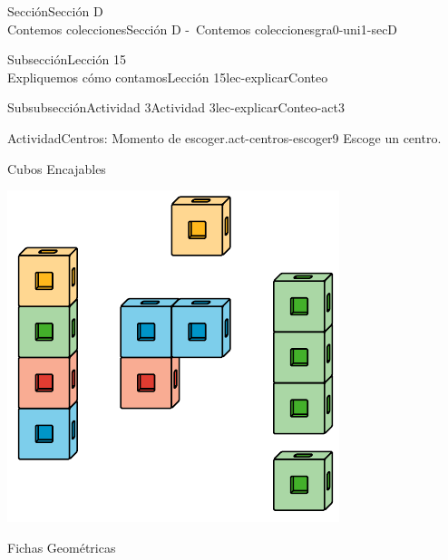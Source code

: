 \begin{sectionptx}{Sección}{{\Large Sección D\\}Contemos colecciones}{}{Sección D -~Contemos colecciones}{}{}{gra0-uni1-secD}
\begin{subsectionptx}{Subsección}{{\normalsize Lección 15\\[-0.05cm]}Expliquemos cómo contamos}{}{Lección 15}{}{}{lec-explicarConteo}
\typeout{************************************************}
%
\begin{subsubsectionptx}{Subsubsección}{Actividad 3}{}{Actividad 3}{}{}{lec-explicarConteo-act3}
\begin{activity}{Actividad}{Centros: Momento de escoger.}{act-centros-escoger9}%
Escoge un centro.%
\begin{sidebyside}{2}{0.025}{0.025}{0.05}%
\begin{sbspanel}{0.45}%
Cubos Encajables%
\par
\includegraphics[max width=\linewidth, center]{external/svg-source/tikz-file-128850.pdf}
\end{sbspanel}%
\begin{sbspanel}{0.45}%
Fichas Geométricas%
\par

\end{sbspanel}
\end{sidebyside}
\end{activity}
\end{subsubsectionptx}
\end{subsectionptx}
\end{sectionptx}
